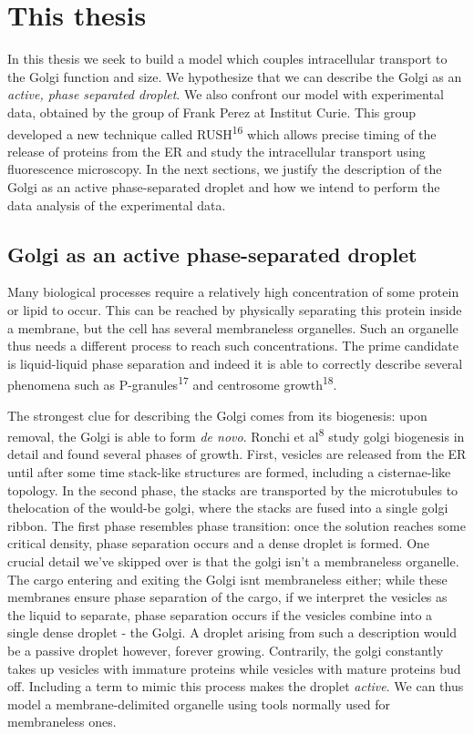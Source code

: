 \documentclass[12pt,a4paper,]{Dissertate}
\begin{document}
\hypertarget{this-thesis}{%
\section{This thesis}\label{this-thesis}}

In this thesis we seek to build a model which couples intracellular
transport to the Golgi function and size. We hypothesize that we can
describe the Golgi as an \emph{active, phase separated droplet}. We also
confront our model with experimental data, obtained by the group of
Frank Perez at Institut Curie. This group developed a new technique
called RUSH\textsuperscript{16} which allows precise timing of the
release of proteins from the ER and study the intracellular transport
using fluorescence microscopy. In the next sections, we justify the
description of the Golgi as an active phase-separated droplet and how we
intend to perform the data analysis of the experimental data.

\hypertarget{golgi-as-an-active-phase-separated-droplet}{%
\subsection{Golgi as an active phase-separated
droplet}\label{golgi-as-an-active-phase-separated-droplet}}

Many biological processes require a relatively high concentration of
some protein or lipid to occur. This can be reached by physically
separating this protein inside a membrane, but the cell has several
membraneless organelles. Such an organelle thus needs a different
process to reach such concentrations. The prime candidate is
liquid-liquid phase separation and indeed it is able to correctly
describe several phenomena such as P-granules\textsuperscript{17} and
centrosome growth\textsuperscript{18}.

The strongest clue for describing the Golgi comes from its biogenesis:
upon removal, the Golgi is able to form \emph{de novo}. Ronchi et
al\textsuperscript{8} study golgi biogenesis in detail and found several
phases of growth. First, vesicles are released from the ER until after
some time stack-like structures are formed, including a cisternae-like
topology. In the second phase, the stacks are transported by the
microtubules to thelocation of the would-be golgi, where the stacks are
fused into a single golgi ribbon. The first phase resembles phase
transition: once the solution reaches some critical density, phase
separation occurs and a dense droplet is formed. One crucial detail
we've skipped over is that the golgi isn't a membraneless organelle. The
cargo entering and exiting the Golgi isnt membraneless either; while
these membranes ensure phase separation of the cargo, if we interpret
the vesicles as the liquid to separate, phase separation occurs if the
vesicles combine into a single dense droplet - the Golgi. A droplet
arising from such a description would be a passive droplet however,
forever growing. Contrarily, the golgi constantly takes up vesicles with
immature proteins while vesicles with mature proteins bud off. Including
a term to mimic this process makes the droplet \emph{active}. We can
thus model a membrane-delimited organelle using tools normally used for
membraneless ones.
\end{document}
